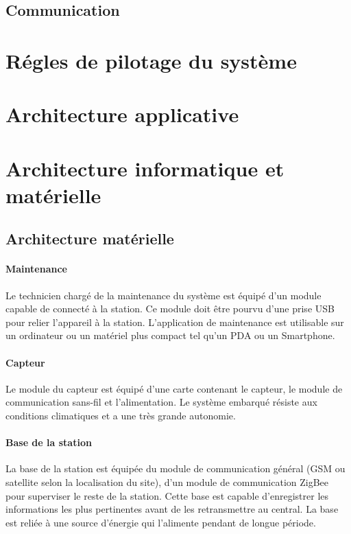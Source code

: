 \subsection{Communication}

\section{Régles de pilotage du système}

\section{Architecture applicative}

\section{Architecture informatique et matérielle}
\subsection{Architecture matérielle}
\paragraph{Maintenance} Le technicien chargé de la maintenance du système est équipé d’un module capable de connecté à la station. Ce module doit être pourvu d’une prise USB pour relier l’appareil à la station. L’application de maintenance est utilisable sur un ordinateur  ou un matériel plus compact tel qu’un PDA ou un Smartphone. 
\paragraph{Capteur} Le module du capteur est équipé d’une carte contenant le capteur, le module de communication sans-fil et l’alimentation. Le système embarqué résiste aux conditions climatiques et a une très grande autonomie.
\paragraph{Base de la station} La base de la station est équipée du module de communication général  (GSM ou satellite selon la localisation du site), d’un module de communication ZigBee pour superviser le reste de la station. Cette base est capable d’enregistrer les informations les plus pertinentes avant de les retransmettre au central. La base est reliée à une source d’énergie qui l’alimente pendant de longue période. 

